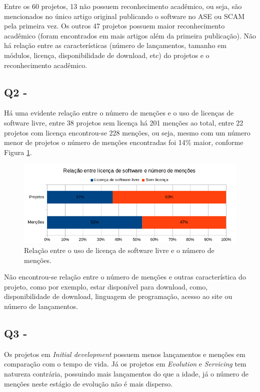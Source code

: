 Entre os 60 projetos, 13 não possuem reconhecimento acadêmico, ou seja, são
mencionados no único artigo original publicando o software no ASE ou SCAM pela
primeira vez. Os outros 47 projetos possuem maior reconhecimento acadêmico
(foram encontrados em mais artigos além da primeira publicação). Não há relação
entre as características (número de lançamentos, tamanho em módulos, licença,
disponibilidade de download, etc) do projetos e o reconhecimento acadêmico.

\subsection{Q2 - \QuestaoDois} %

Há uma evidente relação entre o número de menções e o uso de licenças de
software livre, entre 38 projetos sem licença há 201 menções ao total, entre 22
projetos com licença encontrou-se 228 menções, ou seja, mesmo com um número menor de
projetos o número de menções encontradas foi 14\% maior, conforme Figura \ref{license-vs-mentions}.

\begin{figure}[h]
  \center
  \includegraphics[scale=0.6]{imagens/license-vs-mentions.png}
  \caption{Relação entre o uso de licença de software livre e o número de menções.}
  \label{license-vs-mentions}
\end{figure}

Não encontrou-se relação entre o número de menções e outras característica do
projeto, como por exemplo, estar disponível para download, como,
disponibilidade de download, linguagem de programação, acesso ao site ou número
de lançamentos.

\subsection{Q3 - \QuestaoTres} %

Os projetos em {\it Initial development} possuem menos lançamentos e menções em
comparação com o tempo de vida.  Já os projetos em {\it Evolution} e {\it
Servicing} tem natureza contrária, possuindo mais lançamentos do que a idade,
já o número de menções neste estágio de evolução não é mais disperso.

